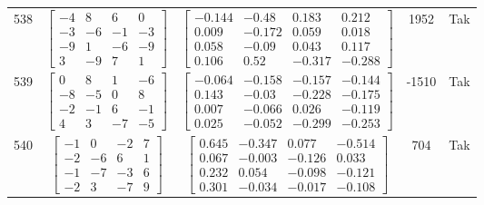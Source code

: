 \documentclass[a4paper,12pt]{article}
\begin{document}
\begin{tabular}{c c c c c}
538
&
$\begin{bmatrix} -4 & 8 & 6 & 0 \\ -3 & -6 & -1 & -3 \\ -9 & 1 & -6 & -9 \\ 3 & -9 & 7 & 1 \end{bmatrix}$
&
$\begin{bmatrix} -0.144 & -0.48 & 0.183 & 0.212 \\ 0.009 & -0.172 & 0.059 & 0.018 \\ 0.058 & -0.09 & 0.043 & 0.117 \\ 0.106 & 0.52 & -0.317 & -0.288 \end{bmatrix}$
&
1952
&
Tak
\\
539
&
$\begin{bmatrix} 0 & 8 & 1 & -6 \\ -8 & -5 & 0 & 8 \\ -2 & -1 & 6 & -1 \\ 4 & 3 & -7 & -5 \end{bmatrix}$
&
$\begin{bmatrix} -0.064 & -0.158 & -0.157 & -0.144 \\ 0.143 & -0.03 & -0.228 & -0.175 \\ 0.007 & -0.066 & 0.026 & -0.119 \\ 0.025 & -0.052 & -0.299 & -0.253 \end{bmatrix}$
&
-1510
&
Tak
\\
540
&
$\begin{bmatrix} -1 & 0 & -2 & 7 \\ -2 & -6 & 6 & 1 \\ -1 & -7 & -3 & 6 \\ -2 & 3 & -7 & 9 \end{bmatrix}$
&
$\begin{bmatrix} 0.645 & -0.347 & 0.077 & -0.514 \\ 0.067 & -0.003 & -0.126 & 0.033 \\ 0.232 & 0.054 & -0.098 & -0.121 \\ 0.301 & -0.034 & -0.017 & -0.108 \end{bmatrix}$
&
704
&
Tak
\\
\end{tabular} \egroup \newpage
\end{document}
